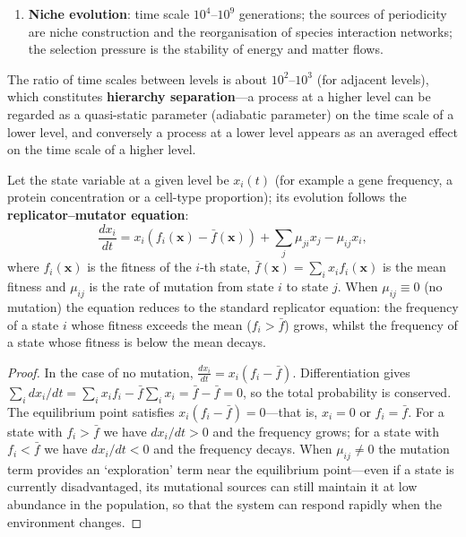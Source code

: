 \begin{definition}
\begin{enumerate}[label=(\roman*)]
    \item \textbf{Niche evolution}: time scale $10^4$--$10^9$ generations; the sources of periodicity are niche construction and the reorganisation of species interaction networks; the selection pressure is the stability of energy and matter flows.
\end{enumerate}
The ratio of time scales between levels is about $10^2$--$10^3$ (for adjacent levels), which constitutes \textbf{hierarchy separation}---a process at a higher level can be regarded as a quasi-static parameter (adiabatic parameter) on the time scale of a lower level, and conversely a process at a lower level appears as an averaged effect on the time scale of a higher level.
\end{definition}

\begin{theorem}\label{thm:natural_selection_general}
Let the state variable at a given level be $x_i(t)$ (for example a gene frequency, a protein concentration or a cell-type proportion); its evolution follows the \textbf{replicator--mutator equation}:
\[
\frac{dx_i}{dt} = x_i \left( f_i(\mathbf{x}) - \bar f(\mathbf{x}) \right) + \sum_j \mu_{ji} x_j - \mu_{ij} x_i,
\]
where $f_i(\mathbf{x})$ is the fitness of the $i$-th state, $\bar f(\mathbf{x}) = \sum_i x_i f_i(\mathbf{x})$ is the mean fitness and $\mu_{ij}$ is the rate of mutation from state $i$ to state $j$. When $\mu_{ij} \equiv 0$ (no mutation) the equation reduces to the standard replicator equation: the frequency of a state $i$ whose fitness exceeds the mean ($f_i > \bar f$) grows, whilst the frequency of a state whose fitness is below the mean decays.
\end{theorem}

\begin{proof}
In the case of no mutation, $\frac{dx_i}{dt} = x_i(f_i - \bar f)$. Differentiation gives $\sum_i dx_i/dt = \sum_i x_i f_i - \bar f \sum_i x_i = \bar f - \bar f = 0$, so the total probability is conserved. The equilibrium point satisfies $x_i(f_i - \bar f) = 0$---that is, $x_i = 0$ or $f_i = \bar f$. For a state with $f_i > \bar f$ we have $dx_i/dt > 0$ and the frequency grows; for a state with $f_i < \bar f$ we have $dx_i/dt < 0$ and the frequency decays. When $\mu_{ij} \neq 0$ the mutation term provides an `exploration' term near the equilibrium point---even if a state is currently disadvantaged, its mutational sources can still maintain it at low abundance in the population, so that the system can respond rapidly when the environment changes.
\end{proof}

